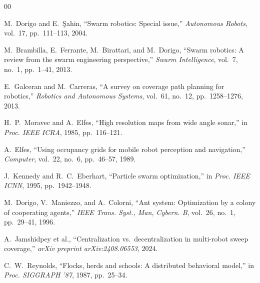 \documentclass[journal,twoside,letterpaper]{IEEEtran}
\begin{document}

\begin{thebibliography}{00}

M.~Dorigo and E.~\c{S}ahin, ``Swarm robotics: Special issue,''
\emph{Autonomous Robots}, vol.~17, pp.~111--113, 2004.

M.~Brambilla, E.~Ferrante, M.~Birattari, and M.~Dorigo,
``Swarm robotics: A review from the swarm engineering perspective,''
\emph{Swarm Intelligence}, vol.~7, no.~1, pp.~1--41, 2013.

E.~Galceran and M.~Carreras,
``A survey on coverage path planning for robotics,''
\emph{Robotics and Autonomous Systems}, vol.~61, no.~12, pp.~1258--1276, 2013.

H.~P.~Moravec and A.~Elfes,
``High resolution maps from wide angle sonar,''
in \emph{Proc. IEEE ICRA}, 1985, pp.~116--121.

A.~Elfes,
``Using occupancy grids for mobile robot perception and navigation,''
\emph{Computer}, vol.~22, no.~6, pp.~46--57, 1989.

J.~Kennedy and R.~C.~Eberhart,
``Particle swarm optimization,''
in \emph{Proc. IEEE ICNN}, 1995, pp.~1942--1948.

M.~Dorigo, V.~Maniezzo, and A.~Colorni,
``Ant system: Optimization by a colony of cooperating agents,''
\emph{IEEE Trans. Syst., Man, Cybern. B}, vol.~26, no.~1, pp.~29--41, 1996.

A.~Jamshidpey et al.,
``Centralization vs.\ decentralization in multi-robot sweep coverage,''
\emph{arXiv preprint arXiv:2408.06553}, 2024.

C.~W.~Reynolds,
``Flocks, herds and schools: A distributed behavioral model,''
in \emph{Proc. SIGGRAPH '87}, 1987, pp.~25--34.

\end{thebibliography}
\end{document}
